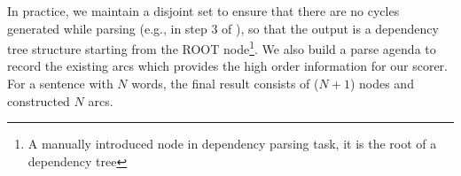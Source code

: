 In practice, we maintain a disjoint set to ensure that
there are no cycles generated while parsing (e.g., in step 3 of
),
so that the output is a dependency tree structure starting from
the ROOT node\footnote{A manually introduced node in dependency parsing task,
it is the root of a dependency tree}.
We also build a parse agenda to record the existing arcs which
provides the high order information for our scorer.
For a sentence with $N$ words, the final result consists of
($N+1$) nodes and constructed $N$ arcs.

